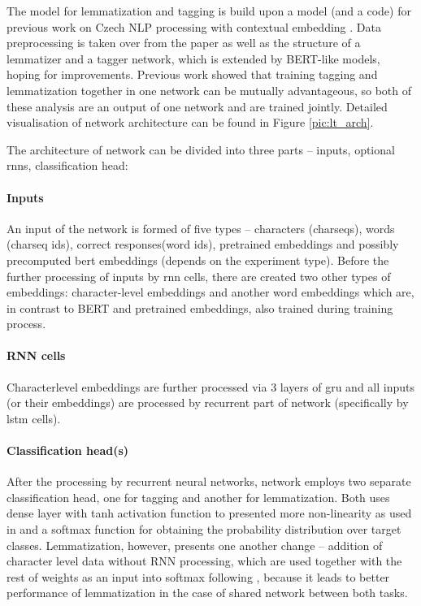 The model for lemmatization and tagging is build upon a model (and a code) for previous work on Czech NLP processing with contextual embedding \citep{straka2019czech}. 
Data preprocessing is taken over from the paper as well as the structure of a lemmatizer and a tagger network, which is extended by BERT-like models, hoping for improvements. %
Previous work showed that training tagging and lemmatization together in one network can be mutually advantageous, so both of these analysis are an output of one network and are trained jointly. Detailed visualisation of network architecture can be found in Figure \ref{pic:lt_arch}. \par The architecture of network can be divided into three parts -- inputs, optional \acrshort{rnn}s, classification head:
\paragraph{Inputs}
An input of the network is formed of five types -- characters (charseqs), words (charseq ids), correct responses(word ids), pretrained embeddings and possibly precomputed bert embeddings (depends on the experiment type). Before the further processing of inputs by \acrshort{rnn} cells, there are created two other types of embeddings: character-level embeddings and another word embeddings which are, in contrast to BERT and pretrained embeddings, also trained during training process.

\paragraph{RNN cells}
Characterlevel embeddings are further processed via 3 layers of \acrfull{gru} and all inputs (or their embeddings) are processed by recurrent part of network (specifically by \acrfull{lstm} cells).

\paragraph{Classification head(s)}
After the processing by recurrent neural networks, network employs two separate classification head, one for tagging and another for lemmatization. Both uses dense layer with tanh activation function to presented more non-linearity as used in \citep{2018} and a softmax function for obtaining the probability distribution over target classes. Lemmatization, however, presents one another change -- addition of character level data without RNN processing, which are used together with the rest of weights as an input into softmax following \citep{Straka2018}, because it leads to better performance of lemmatization in the case of shared network between both tasks.

